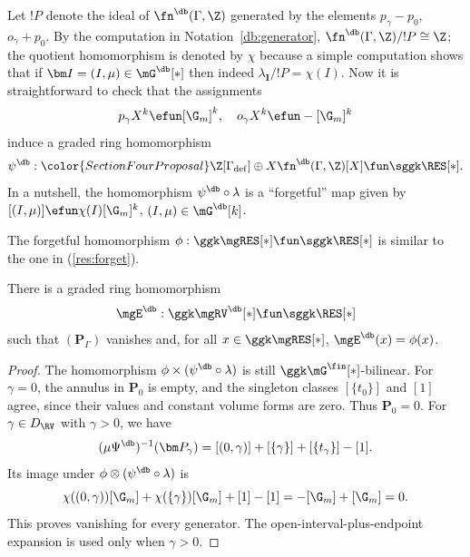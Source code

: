 \begin{rem}\label{db:gam:res}
Let $!P$ denote the ideal of $\fn^{\db}(\Gamma, \Z)$ generated by the elements $p_\gamma - p_0$, $o_\gamma + p_0$. By the computation in Notation~\ref{db:generator}, $\fn^{\db}(\Gamma, \Z) / !P \cong \Z$; the quotient homomorphism is denoted by $\chi$ because a simple computation shows that if $\bm I = (I, \mu) \in \mG^{\db}[*]$ then indeed $\lambda_{\bm I} / !P = \chi(I)$. Now it is straightforward to check that the assignments
\begin{equation}\label{Gam:ass:bd}
p_\gamma X^k \efun  [\G_m]^{k}, \quad o_\gamma X^k \efun  - [\G_m]^{k}
\end{equation}
induce a graded ring homomorphism
\[
\psi^{\db} : {\color{SectionFourProposal}\Z[\Gamma_{\mathrm{def}}]} \oplus X\fn^{\db}(\Gamma, \Z)[X] \fun \sggk \RES[*].
\]
In a nutshell, the  homomorphism $\psi^{\db} \circ \lambda$ is a ``forgetful'' map  given by $[(I, \mu)] \efun \chi(I)[\G_m]^{k}$, $(I, \mu) \in \mG^{\db}[k]$.
\end{rem}


The forgetful homomorphism $\phi : \ggk \mgRES[*] \fun \sggk \RES[*]$ is similar to the one in  (\ref{res:forget}).

\begin{prop}\label{prop:eu:retr:k:db}
There is a graded ring homomorphism
\[
  \mgE^{\db}: \ggk \mgRV^{\db}[*] \fun \sggk \RES[*]
\]
such that $(\bm P_\Gamma)$ vanishes and, for all $x \in \ggk \mgRES[*]$, $\mgE^{\db}(x) = \phi(x)$.
\end{prop}
\begin{proof}
The homomorphism $\phi \times (\psi^{\db} \circ \lambda)$ is still $\ggk \mG^{\fin}[*]$-bilinear. {\color{SectionFourProposal}For $\gamma=0$, the annulus in $\bm P_0$ is empty, and the singleton classes $[\{t_0\}]$ and $[1]$ agree, since their values and constant volume forms are zero. Thus $\bm P_0=0$. For $\gamma\in D_{\RV}$ with $\gamma>0$, we have
\[
({\mu} \Psi^{\db})^{-1}(\bm P_\gamma) = [(0, \gamma)] + [\{\gamma\}] + [\{t_\gamma\}] - [1].
\]
Its image under $\phi\otimes(\psi^{\db}\circ\lambda)$ is
\[
\chi((0,\gamma))[\G_m]+\chi(\{\gamma\})[\G_m]+[1]-[1]
=-[\G_m]+[\G_m]=0.
\]
This proves vanishing for every generator. The open-interval-plus-endpoint expansion is used only when $\gamma>0$.}

\end{proof}

